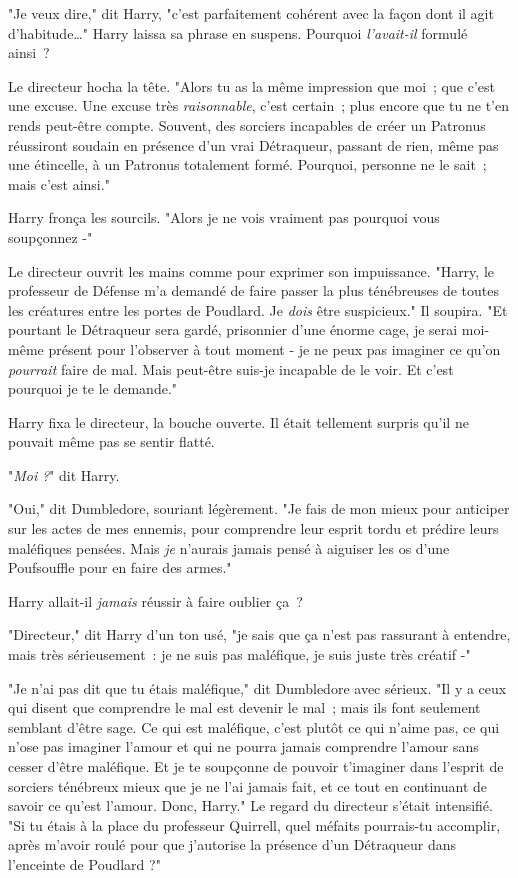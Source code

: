 "Je veux dire," dit Harry, "c'est parfaitement cohérent avec la façon dont il agit d'habitude…" Harry laissa sa phrase en suspens. Pourquoi \emph{l'avait-il} formulé ainsi~?

Le directeur hocha la tête. "Alors tu as la même impression que moi~; que c'est une excuse. Une excuse très \emph{raisonnable}, c'est certain~; plus encore que tu ne t'en rends peut-être compte. Souvent, des sorciers incapables de créer un Patronus réussiront soudain en présence d'un vrai Détraqueur, passant de rien, même pas une étincelle, à un Patronus totalement formé. Pourquoi, personne ne le sait~; mais c'est ainsi."

Harry fronça les sourcils. "Alors je ne vois vraiment pas pourquoi vous soupçonnez -"

Le directeur ouvrit les mains comme pour exprimer son impuissance. "Harry, le professeur de Défense m'a demandé de faire passer la plus ténébreuses de toutes les créatures entre les portes de Poudlard. Je \emph{dois} être suspicieux." Il soupira. "Et pourtant le Détraqueur sera gardé, prisonnier d'une énorme cage, je serai moi-même présent pour l'observer à tout moment - je ne peux pas imaginer ce qu'on \emph{pourrait} faire de mal. Mais peut-être suis-je incapable de le voir. Et c'est pourquoi je te le demande."

Harry fixa le directeur, la bouche ouverte. Il était tellement surpris qu'il ne pouvait même pas se sentir flatté.

"\emph{Moi} \emph{?}" dit Harry.

"Oui," dit Dumbledore, souriant légèrement. "Je fais de mon mieux pour anticiper sur les actes de mes ennemis, pour comprendre leur esprit tordu et prédire leurs maléfiques pensées. Mais \emph{je} n'aurais jamais pensé à aiguiser les os d'une Poufsouffle pour en faire des armes."

Harry allait-il \emph{jamais} réussir à faire oublier ça~?

"Directeur," dit Harry d'un ton usé, "je sais que ça n'est pas rassurant à entendre, mais très sérieusement~: je ne suis pas maléfique, je suis juste très créatif -"

"Je n'ai pas dit que tu étais maléfique," dit Dumbledore avec sérieux. "Il y a ceux qui disent que comprendre le mal est devenir le mal~; mais ils font seulement semblant d'être sage. Ce qui est maléfique, c'est plutôt ce qui n'aime pas, ce qui n'ose pas imaginer l'amour et qui ne pourra jamais comprendre l'amour sans cesser d'être maléfique. Et je te soupçonne de pouvoir t'imaginer dans l'esprit de sorciers ténébreux mieux que je ne l'ai jamais fait, et ce tout en continuant de savoir ce qu'est l'amour. Donc, Harry." Le regard du directeur s'était intensifié. "Si tu étais à la place du professeur Quirrell, quel méfaits pourrais-tu accomplir, après m'avoir roulé pour que j'autorise la présence d'un Détraqueur dans l'enceinte de Poudlard ?"

